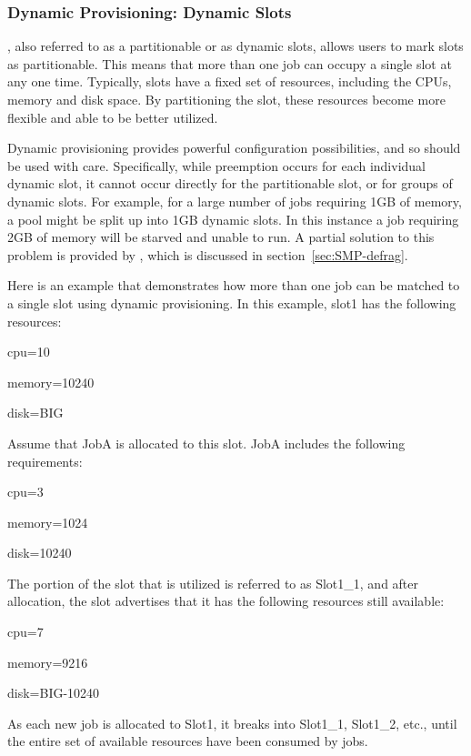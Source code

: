 \subsubsection{\label{sec:SMP-dynamicprovisioning}
Dynamic  Provisioning: Dynamic Slots}

,
also referred to as a partitionable  or as dynamic slots,
allows users to mark slots as partitionable. 
This means that more than one job can occupy a single slot at any one time. 
Typically, slots have a fixed set of resources,
including the CPUs, memory and disk space. 
By partitioning the slot, 
these resources become more flexible and able to be better utilized.

Dynamic provisioning provides powerful configuration
possibilities, and so should be used with care. 
Specifically, while preemption occurs for each individual dynamic slot,
it cannot occur directly for the partitionable slot, 
or for groups of dynamic slots. 
For example, for a large number of jobs requiring 1GB of memory,
a pool might be split up into 1GB dynamic slots. 
In this instance a job requiring 2GB of memory will be starved
and unable to run.  A partial solution to this problem is provided
by , which is discussed in section~\ref{sec:SMP-defrag}.

Here is an example that demonstrates how more than one job
can be matched to a single slot using dynamic provisioning.
In this example, slot1 has the following resources:
\begin{description}
  \item{cpu=10}
  \item{memory=10240}
  \item{disk=BIG}
\end{description}
Assume that JobA is allocated to this slot.
JobA includes the following requirements:
\begin{description}
  \item{cpu=3}
  \item{memory=1024}
  \item{disk=10240} 
\end{description}
The portion of the slot that is utilized is referred to as Slot1\_1,
and after allocation, the slot advertises that it has
the following resources still available:
\begin{description}
  \item{cpu=7}
  \item{memory=9216}
  \item{disk=BIG-10240}
\end{description}
As each new job is allocated to Slot1,
it breaks into Slot1\_1, Slot1\_2, etc., until the entire set of
available resources have been consumed by jobs.

